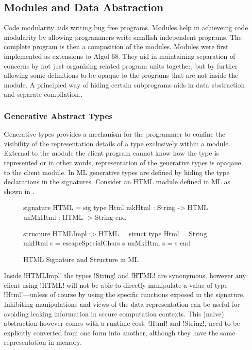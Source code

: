 \documentclass[manuscript,screen,nonacm]{acmart}
\begin{document}
\subsection{Modules and Data Abstraction}
Code modularity aids writing bug free programs. Modules help in achieveing code modularity by allowing programmers write smallish independent programs. The complete program is then a composition of the modules. Modules were first implemented as extensions to Algol 68. They aid in maintaining separation of concerns by not just organizing related program units together, but by further allowing some definitions to be opaque to the programs that are not inside the module. A principled way of hiding certain subprograms aids in data abstraction and separate compilation.,

\subsubsection{Generative Abstract Types}
Generative types provides a mechanism for the programmer to confine the visibility of the representation details of a type exclusively within a module. External to the module the client program cannot know how the type is represented or in other words, representation of the generative types is opaqaue to the client module. In ML generative types are defined by hiding the type declarations in the signatures. Consider an HTML module defined in ML as shown in .

\begin{figure}[ht]
  \centering
  \begin{minipage}[ht]{0.4\linewidth}
    \begin{code}
      signature HTML = sig
          type Html
          mkHtml : String -> HTML
          unMkHtml : HTML -> String
      end
    \end{code}
  \end{minipage}%
  \begin{minipage}[ht]{0.4\linewidth}
    \begin{code}
      structure HTMLImpl :> HTML = struct
          type Html = String
          mkHtml s = escapeSpecialChars s
          unMkHtml s = s
      end
    \end{code}
  \end{minipage}
  \caption{HTML Signature and Structure in ML}
  \label{fig:ml-generative-type}
\end{figure}

Inside !HTMLImpl! the types !String! and !HTML! are synonymous, however any client using !HTML! will not be able to directly manipulate a value of type !Html!---unless of course by using the specific functions exposed in the signature. Inhibiting manipulations and views of the data representation can be useful for avoiding leaking information in secure computation contexts. This (naive) abstraction however comes with a runtime cost. !Html! and !String!, need to be explicitly converted from one form into another, although they have the same representation in memory.
\end{document}

